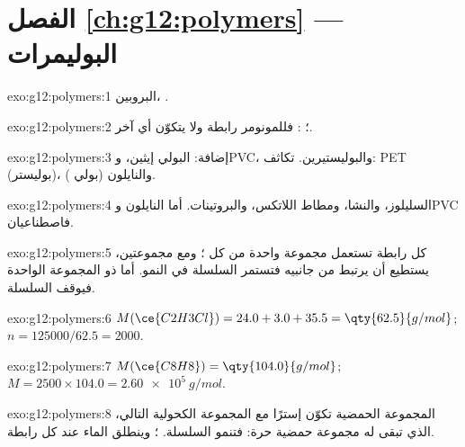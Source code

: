 \section*{الفصل \ref{ch:g12:polymers} --- البوليمرات}

\begin{solution}{exo:g12:polymers:1}
البروبين، .
\end{solution}

\begin{solution}{exo:g12:polymers:2}
؛ : فللمونومر رابطة 
ولا يتكوّن أي  آخر.
\end{solution}

\begin{solution}{exo:g12:polymers:3}
إضافة: البولي إيثين، وPVC، والبوليستيرين. تكاثف: PET (بوليستر)،
والنايلون (بولي ).
\end{solution}

\begin{solution}{exo:g12:polymers:4}
السليلوز، والنشا، ومطاط اللاتكس، والبروتينات. أما النايلون وPVC
فاصطناعيان.
\end{solution}

\begin{solution}{exo:g12:polymers:5}
كل رابطة تستعمل مجموعة واحدة من كل ؛ ومع مجموعتين، يستطيع
 أن يرتبط من جانبيه فتستمر السلسلة في النمو. أما  ذو
المجموعة الواحدة فيوقف السلسلة.
\end{solution}

\begin{solution}{exo:g12:polymers:6}
$M(\ce{C2H3Cl}) = 24.0 + 3.0 + 35.5 = \qty{62.5}{g/mol}$;
$n = 125000/62.5 = 2000$.
\end{solution}

\begin{solution}{exo:g12:polymers:7}
$M(\ce{C8H8}) = \qty{104.0}{g/mol}$; $M = 2500 \times 104.0 =
\qty{2.60e5}{g/mol}$.
\end{solution}

\begin{solution}{exo:g12:polymers:8}
المجموعة الحمضية  تكوّن إسترًا مع المجموعة الكحولية
 التالي، الذي تبقى له مجموعة حمضية حرة: فتنمو السلسلة.  ؛ وينطلق الماء عند كل رابطة.
\end{solution}

